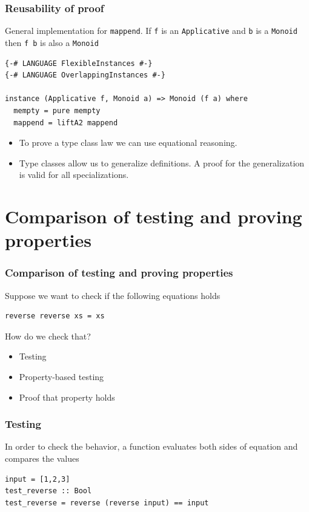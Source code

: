 \documentclass{beamer}
\begin{document}
\begin{frame}[fragile]
\frametitle{Reusability of proof}
General implementation for \verb|mappend|. If \verb|f| is an \verb|Applicative| and \verb|b| is a \verb|Monoid| then \verb|f b| is also a \verb|Monoid|
\begin{verbatim}
{-# LANGUAGE FlexibleInstances #-}
{-# LANGUAGE OverlappingInstances #-}

instance (Applicative f, Monoid a) => Monoid (f a) where
  mempty = pure mempty
  mappend = liftA2 mappend
\end{verbatim}
\begin{itemize}
\item To prove a type class law we can use equational reasoning.
\item Type classes allow us to generalize definitions. A proof for the generalization is valid for all specializations.
\end{itemize}


\end{frame}

\section{Comparison of testing and proving properties}

\begin{frame}[fragile]
  \frametitle{Comparison of testing and proving properties}
  Suppose we want to check if the following equations holds
\begin{verbatim}
reverse reverse xs = xs
\end{verbatim}
How do we check that?
\begin{itemize}
\item Testing
\item Property-based testing
\item Proof that property holds
\end{itemize}

\end{frame}

\begin{frame}[fragile]
  \frametitle{Testing}
 In order to check the behavior, a function evaluates both sides of equation and compares the values
\begin{verbatim}
input = [1,2,3]
test_reverse :: Bool
test_reverse = reverse (reverse input) == input
\end{verbatim}
\end{frame}
\end{document}
